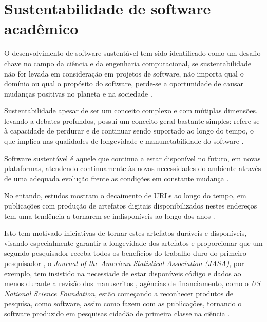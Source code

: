 \section{Sustentabilidade de software acadêmico}


O desenvolvimento de software sustentável tem sido identificado como um desafio
chave no campo da ciência e da engenharia computacional, se sustentabilidade
não for levada em consideração em projetos de software, não importa qual o
domínio ou qual o propósito do software, perde-se a oportunidade de causar
mudanças positivas no planeta e na sociedade \cite{becker2014karlskrona}.

Sustentabilidade apesar de ser um conceito complexo e com mútiplas dimensões,
levando a debates profundos, possui um conceito geral bastante simples: refere-se à
capacidade de perdurar e de continuar sendo suportado ao longo do tempo, o que 
implica nas qualidades de longevidade e manunetabilidade do software
\cite{venters2014software}.

Software sustentável é aquele que continua a estar disponível no futuro, em
novas plataformas, atendendo continuamente às novas necessidades do ambiente
através de uma adequada evolução frente as condições em constante mudança
\cite{allen2017engineering}.

No entando, estudos mostram o decaimento de URLs ao longo do tempo, em
publicações com produção de artefatos digitais disponibilizados nestes
endereços tem uma tendência a tornarem-se indisponíveis ao longo dos anos
\cite{wren2017use}.

Isto tem motivado iniciativas de tornar estes artefatos duráveis e disponíveis,
visando especialmente garantir a longevidade dos artefatos e proporcionar que
um segundo pesquisador receba todos os benefícios do trabalho duro do primeiro
pesquisador \cite{king1995replication},
o {\it Journal of the American Statistical Association (JASA)}, por
exemplo, tem insistido na necessiade de estar disponíveis código e dados ao
menos durante a revisão dos manuscritos \cite{baker2016scientists}, agências de
financiamento, como o {\it US National Science Foundation}, estão começando a
reconhecer produtos de pesquisa, como software, assim como fazem com as
publicações, tornando o software produzido em pesquisas cidadão de primeira
classe na ciência \cite{allen2017engineering}.


